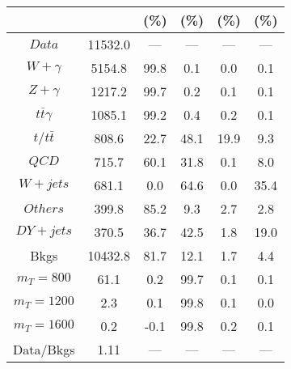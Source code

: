 \begin{figure}
\begin{minipage}[c]{0.32\textwidth}
{\begin{tabular}{cccccc}
 &  & (\%) & (\%) & (\%) & (\%)  \\
\hline
                                                                      $ Data $ &  11532.0 &  --- &  --- &  --- &  ---\\
$ W+\gamma $ &  5154.8 &  99.8 &  0.1 &  0.0 &  0.1\\
$ Z+\gamma $ &  1217.2 &  99.7 &  0.2 &  0.1 &  0.1\\
$ t\bar{t}\gamma $ &  1085.1 &  99.2 &  0.4 &  0.2 &  0.1\\
$ t/t\bar{t} $ &  808.6 &  22.7 &  48.1 &  19.9 &  9.3\\
$ QCD $ &  715.7 &  60.1 &  31.8 &  0.1 &  8.0\\
$ W+jets $ &  681.1 &  0.0 &  64.6 &  0.0 &  35.4\\
$ Others $ &  399.8 &  85.2 &  9.3 &  2.7 &  2.8\\
$ DY+jets $ &  370.5 &  36.7 &  42.5 &  1.8 &  19.0\\
Bkgs &  10432.8 &  81.7 &  12.1 &  1.7 &  4.4\\
$ m_{T} = 800 $ &  61.1 &  0.2 &  99.7 &  0.1 &  0.1\\
$ m_{T} = 1200 $ &  2.3 &  0.1 &  99.8 &  0.1 &  0.0\\
$ m_{T} = 1600 $ &  0.2 &  -0.1 &  99.8 &  0.2 &  0.1\\
Data/Bkgs &  1.11 &  --- &  --- &  --- &  ---\\
\hline
\end{tabular}
}
\end{minipage}
\end{figure}

